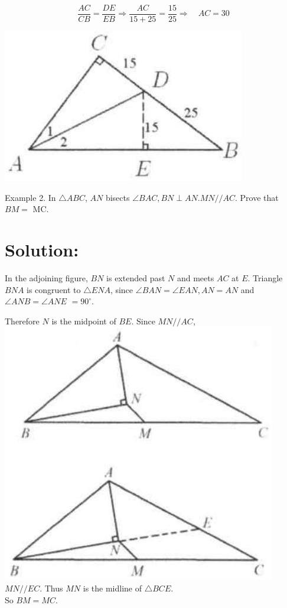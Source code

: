 \documentclass[10pt]{article}
\begin{document}
\[
\frac{A C}{C B}=\frac{D E}{E B} \Rightarrow \frac{A C}{15+25}=\frac{15}{25} \Rightarrow \quad A C=30
\]

\begin{center}
\includegraphics[max width=\textwidth]{2025_04_17_97bc1f7e44d93c271a88g-055(3)}
\end{center}

Example 2. In \(\triangle A B C\), \(A N\) bisects \(\angle B A C, B N \perp A N . M N / / A C\). Prove that \(B M=\) MC.

\section*{Solution:}
In the adjoining figure, \(B N\) is extended past \(N\) and meets \(A C\) at \(E\). Triangle \(B N A\) is congruent to \(\triangle E N A\), since \(\angle B A N=\angle E A N, A N=A N\) and \(\angle A N B=\angle A N E\) \(=90^{\circ}\).

Therefore \(N\) is the midpoint of \(B E\). Since \(M N / / A C\),\\
\includegraphics[max width=\textwidth]{2025_04_17_97bc1f7e44d93c271a88g-055(1)} \(M N / / E C\). Thus \(M N\) is the midline of \(\triangle B C E\).\\
So \(B M=M C\).
\end{document}

